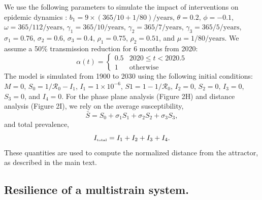 \documentclass[12pt]{article}
\newcommand{\tsub}[2]{#1_{{\textrm{\tiny #2}}}}
\begin{document}
We use the following parameters to simulate the impact of interventions on epidemic dynamics \citep{pitzer2015environmental}: $b_1 = 9 \times (365/10+1/80)/\mathrm{years}$, $\theta = 0.2$, $\phi = -0.1$, $\omega=365/112/\mathrm{years}$, $\gamma_1=365/10/\mathrm{years}$, $\gamma_2=365/7/\mathrm{years}$, $\gamma_3=365/5/\mathrm{years}$, $\sigma_1 = 0.76$, $\sigma_2 = 0.6$, $\sigma_3 = 0.4$, $\rho_1 = 0.75$, $\rho_2 = 0.51$, and $\mu = 1/80/\mathrm{years}$.
We assume a 50\% transmission reduction for 6 months from 2020:
\begin{equation}
\alpha(t) = \begin{cases}
0.5 & 2020 \leq t< 2020.5\\
1 & \textrm{otherwise}
\end{cases}
\end{equation}
The model is simulated from 1900 to 2030 using the following initial conditions: $M=0$, $S_0=1/\mathcal R_0-I_1$, $I_1=1\times 10^{-6}$, $S1=1-1/\mathcal R_0$, $I_2=0$, $S_2=0$, $I_3=0$, $S_3=0$, and $I_4=0$.
For the phase plane analysis (Figure 2H) and distance analysis (Figure 2I), we rely on the average susceptibility,
\begin{equation}
\bar{S} = S_0 + \sigma_1 S_1 + \sigma_2 S_2 + \sigma_3 S_3,
\end{equation}
and total prevalence,
\begin{equation}
\tsub{I}{total} = I_1 + I_2 + I_3 + I_4.
\end{equation}
These quantities are used to compute the normalized distance from the attractor, as described in the main text.

\subsection*{Resilience of a multistrain system.}
\end{document}
